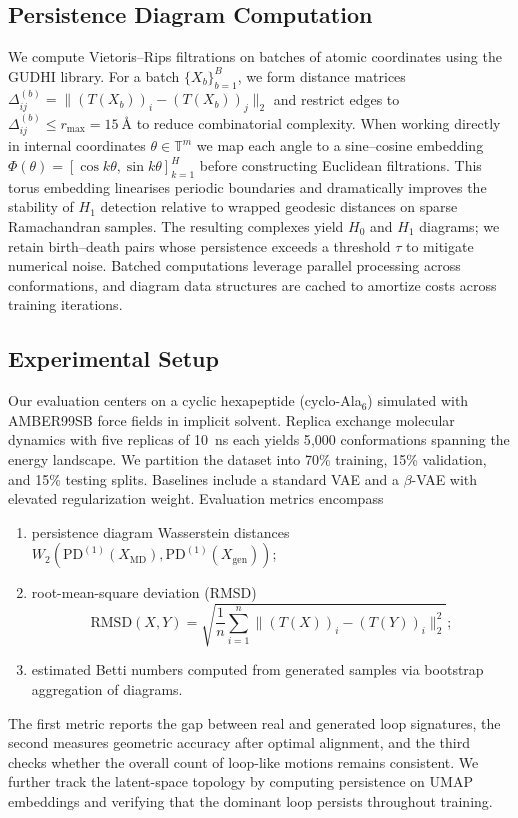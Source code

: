 \documentclass[11pt]{article}
\theoremstyle{definition}
\begin{document}
\subsection{Persistence Diagram Computation}
We compute Vietoris--Rips filtrations on batches of atomic coordinates using the GUDHI library. For a batch $\{X_b\}_{b=1}^B$, we form distance matrices $\Delta^{(b)}_{ij} = \| (T(X_b))_i - (T(X_b))_j \|_2$ and restrict edges to $\Delta^{(b)}_{ij} \leq r_{\max} = 15~\text{\AA}$ to reduce combinatorial complexity. When working directly in internal coordinates $\theta \in \mathbb{T}^m$ we map each angle to a sine--cosine embedding $\Phi(\theta) = [\cos k\theta, \sin k\theta]_{k=1}^H$ before constructing Euclidean filtrations. This torus embedding linearises periodic boundaries and dramatically improves the stability of $H_1$ detection relative to wrapped geodesic distances on sparse Ramachandran samples. The resulting complexes yield $H_0$ and $H_1$ diagrams; we retain birth--death pairs whose persistence exceeds a threshold $\tau$ to mitigate numerical noise. Batched computations leverage parallel processing across conformations, and diagram data structures are cached to amortize costs across training iterations.

\subsection{Experimental Setup}
Our evaluation centers on a cyclic hexapeptide (cyclo-Ala$_6$) simulated with AMBER99SB force fields in implicit solvent. Replica exchange molecular dynamics with five replicas of 10~ns each yields 5{,}000 conformations spanning the energy landscape. We partition the dataset into 70\% training, 15\% validation, and 15\% testing splits. Baselines include a standard VAE and a $\beta$-VAE with elevated regularization weight. Evaluation metrics encompass
\begin{enumerate}[label=\roman*)]
    \item persistence diagram Wasserstein distances $W_{2}(\mathrm{PD}^{(1)}(X_{\text{MD}}), \mathrm{PD}^{(1)}(X_{\text{gen}}))$;
    \item root-mean-square deviation (RMSD)
    \begin{equation}
        \mathrm{RMSD}(X, Y) = \sqrt{\frac{1}{n} \sum_{i=1}^n \big\| (T(X))_i - (T(Y))_i \big\|_2^2};
        \label{eq:rmsd}
    \end{equation}
    \item estimated Betti numbers computed from generated samples via bootstrap aggregation of diagrams.
\end{enumerate}
The first metric reports the gap between real and generated loop signatures, the second measures geometric accuracy after optimal alignment, and the third checks whether the overall count of loop-like motions remains consistent. We further track the latent-space topology by computing persistence on UMAP embeddings and verifying that the dominant loop persists throughout training.
\end{document}
